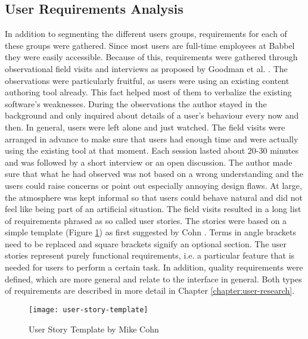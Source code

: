 \subsection{User Requirements Analysis}
In addition to segmenting the different users groups, requirements for each of these groups were gathered. Since most users are full-time employees at Babbel they were easily accessible. Because of this, requirements were gathered through observational field visits and interviews as proposed by Goodman et al. \cite{goodman_observing_2012}. The observations were particularly fruitful, as users were using an existing content authoring tool already. This fact helped most of them to verbalize the existing software's weaknesses. During the observations the author stayed in the background and only inquired about details of a user's behaviour every now and then. In general, users were left alone and just watched. The field visits were arranged in advance to make sure that users had enough time and were actually using the existing tool at that moment. Each session lasted about 20-30 minutes and was followed by a short interview or an open discussion. The author made sure that what he had observed was not based on a wrong understanding and the users could raise concerns or point out especially annoying design flaws. At large, the atmosphere was kept informal so that users could behave natural and did not feel like being part of an artificial situation. The field visits resulted in a long list of requirements phrased as so called user stories. The stories were based on a simple template (Figure \ref{fig:user-story-template}) as first suggested by Cohn \cite{cohn_user_2004}. Terms in angle brackets need to be replaced and square brackets signify an optional section. The user stories represent purely functional requirements, i.e. a particular feature that is needed for users to perform a certain task. In addition, quality requirements were defined, which are more general and relate to the interface in general. Both types of requirements are described in more detail in Chapter \ref{chapter:user-research}.

\begin{figure}[h!]
\centering
\texttt{[image: user-story-template]}
\caption{User Story Template by Mike Cohn}
\label{fig:user-story-template}
\end{figure}



